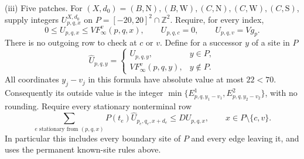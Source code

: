 \begin{definition}[H3-line]
\smallskip\noindent
\textup{(iii) Five patches.}
For $(X,d_0)=(B,\mathrm N),(B,\mathrm W),(C,\mathrm N),
(C,\mathrm W),(C,\mathrm S)$, supply integers
$U^{X,d_0}_{p,q,x}$ on $P=[-20,20]^2\cap\mathbb Z^2$.
Require, for every index,
\begin{equation}\label{hl:patchcaps}
 0\le U_{p,q,x}\le V F^v_\infty(p,q,x),\qquad
 U_{p,q,c}=0,\qquad U_{p,q,v}=Vg_p.
\end{equation}
There is no outgoing row to check at $c$ or $v$.  Define for a
successor $y$ of a site in $P$
\[
 \widehat U_{p,q,y}=\begin{cases}
 U_{p,q,y},&y\in P,\\
 V F^v_\infty(p,q,y),&y\notin P.
 \end{cases}
\]
All coordinates $y_j-v_j$ in this formula have absolute value at
most $22<70$.  Consequently its outside value is the integer
$\min\{E^1_{p,q,y_1-v_1},E^2_{p,q,y_2-v_2}\}$, with no rounding.
Require every stationary nonterminal row
\begin{equation}\label{hl:patchrow}
 \sum_{e\text{ stationary from }(p,q,x)}P(t_e)
                  \widehat U_{p_e,q_e,x+d_e}
                    \le D U_{p,q,x},\qquad x\in P\setminus\{c,v\}.
\end{equation}
In particular this includes every boundary site of $P$ and every
edge leaving it, and uses the permanent known-site rules above.


\end{definition}
